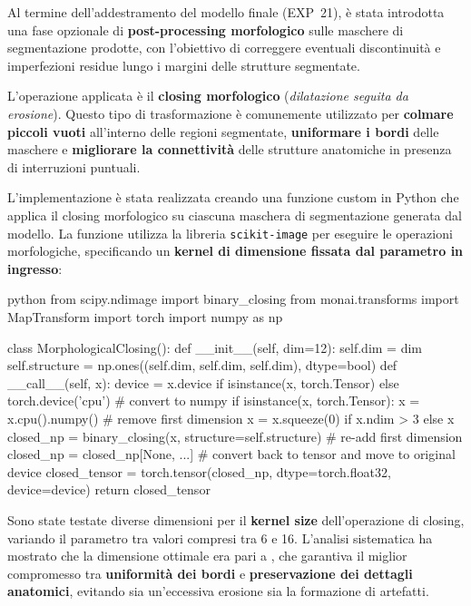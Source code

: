 
Al termine dell’addestramento del modello finale (EXP~21), è stata introdotta una fase opzionale di \textbf{post-processing morfologico} sulle maschere di segmentazione prodotte, con l’obiettivo di correggere eventuali discontinuità e imperfezioni residue lungo i margini delle strutture segmentate.

L’operazione applicata è il \textbf{closing morfologico} (\emph{dilatazione seguita da erosione}). Questo tipo di trasformazione è comunemente utilizzato per \textbf{colmare piccoli vuoti} all’interno delle regioni segmentate, \textbf{uniformare i bordi} delle maschere e \textbf{migliorare la connettività} delle strutture anatomiche in presenza di interruzioni puntuali.


L'implementazione è stata realizzata creando una funzione custom in Python che applica il closing morfologico su ciascuna maschera di segmentazione generata dal modello. La funzione utilizza la libreria \texttt{scikit-image} per eseguire le operazioni morfologiche, specificando un \textbf{kernel di dimensione fissata dal parametro in ingresso}:

\begin{code}{python}
from scipy.ndimage import binary_closing
from monai.transforms import MapTransform
import torch
import numpy as np

class MorphologicalClosing():
    def __init__(self, dim=12):
        self.dim = dim
        self.structure = np.ones((self.dim, self.dim, self.dim), dtype=bool)
    def __call__(self, x):
        device = x.device if isinstance(x, torch.Tensor) else torch.device('cpu')
        # convert to numpy
        if isinstance(x, torch.Tensor):
            x = x.cpu().numpy()
        # remove first dimension
        x = x.squeeze(0) if x.ndim > 3 else x
        closed_np = binary_closing(x, structure=self.structure)
        # re-add first dimension
        closed_np = closed_np[None, ...]
        # convert back to tensor and move to original device
        closed_tensor = torch.tensor(closed_np, dtype=torch.float32, 
                                    device=device)
        return closed_tensor
\end{code}
Sono state testate diverse dimensioni per il \textbf{kernel size} dell’operazione di closing, variando il parametro tra valori compresi tra 6 e 16. L’analisi sistematica ha mostrato che la dimensione ottimale era pari a , che garantiva il miglior compromesso tra \textbf{uniformità dei bordi} e \textbf{preservazione dei dettagli anatomici}, evitando sia un’eccessiva erosione sia la formazione di artefatti.

